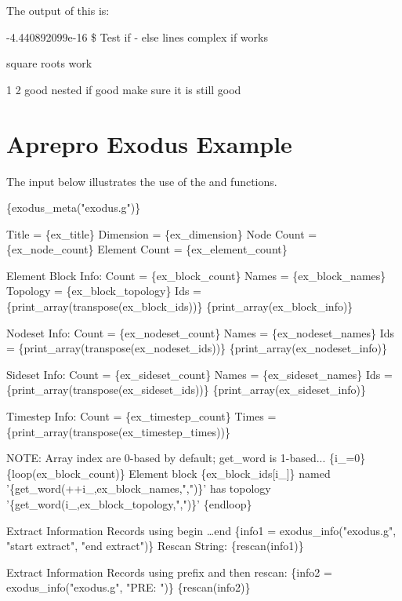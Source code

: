 The output of this is:
\begin{apout}
-4.440892099e-16
\$ Test if - else lines
 complex if works

       square roots work

1 2
     good nested if
  good
  make sure it is still good
\end{apout}

\section{Aprepro Exodus Example}

The input below illustrates the use of the  and  functions.
\begin{apinp}
\{exodus_meta("exodus.g")\}

        Title = \{ex_title\}
    Dimension = \{ex_dimension\}
   Node Count = \{ex_node_count\}
Element Count = \{ex_element_count\}

Element Block Info:
        Count = \{ex_block_count\}
        Names = \{ex_block_names\}
     Topology = \{ex_block_topology\}
          Ids = \{print_array(transpose(ex_block_ids))\}
\{print_array(ex_block_info)\}

Nodeset Info:
        Count = \{ex_nodeset_count\}
        Names = \{ex_nodeset_names\}
          Ids = \{print_array(transpose(ex_nodeset_ids))\}
\{print_array(ex_nodeset_info)\}

Sideset Info:
        Count = \{ex_sideset_count\}
        Names = \{ex_sideset_names\}
          Ids = \{print_array(transpose(ex_sideset_ids))\}
\{print_array(ex_sideset_info)\}

Timestep Info:
        Count = \{ex_timestep_count\}
        Times = \{print_array(transpose(ex_timestep_times))\}

NOTE: Array index are 0-based by default; get_word is 1-based... \{i_=0\}
\{loop(ex_block_count)\}
Element block \{ex_block_ids[i_]\} named '\{get_word(++i_,ex_block_names,",")\}' has topology '\{get_word(i_,ex_block_topology,",")\}'
\{endloop\}

Extract Information Records using begin \ldots end
\{info1 = exodus_info("exodus.g", "start extract", "end extract")\}
Rescan String:
\{rescan(info1)\}

Extract Information Records using prefix and then rescan:
\{info2 = exodus_info("exodus.g", "PRE: ")\}
\{rescan(info2)\}
\end{apinp}

